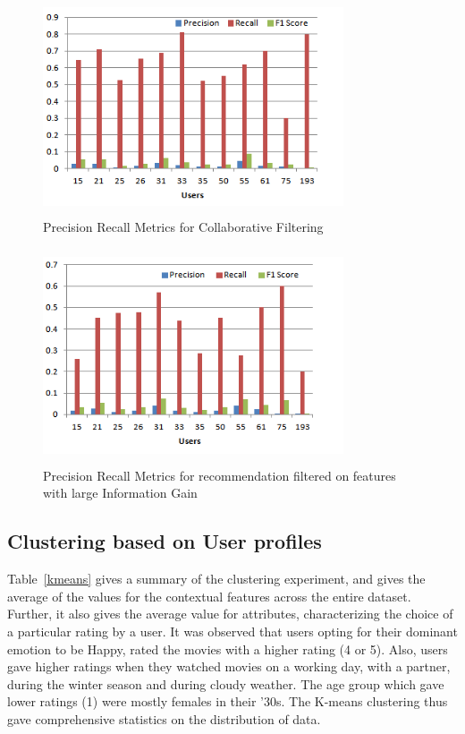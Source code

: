 \documentclass{article}
\begin{document}
\begin{figure}[H]
\centering
\includegraphics[height=2.5in, width=3.5in]{PrecRecallBasic.png}
\caption{Precision Recall Metrics for Collaborative Filtering}
\label{precrecallbasic}
\end{figure}

\begin{figure}[H]
\includegraphics[height=2.5in, width=3.5in]{PrecRecallIG.png}
\caption{Precision Recall Metrics for recommendation filtered on features with large Information Gain}
\label{precrecallig}
\end{figure}



\subsection{Clustering based on User profiles}
 Table~\ref{kmeans} gives a summary of the clustering experiment, and gives the average of the values for the contextual features across the entire dataset. Further, it also gives the average value for attributes, characterizing the choice of a particular rating by a user. It was observed that users opting for their dominant emotion to be Happy, rated the movies with a higher rating (4 or 5). Also, users gave higher ratings when they watched movies on a working day, with a partner, during the winter season and during cloudy weather. The age group which gave lower ratings (1) were mostly females in their '30s. The K-means clustering thus gave comprehensive statistics on the distribution of data.
\end{document}
